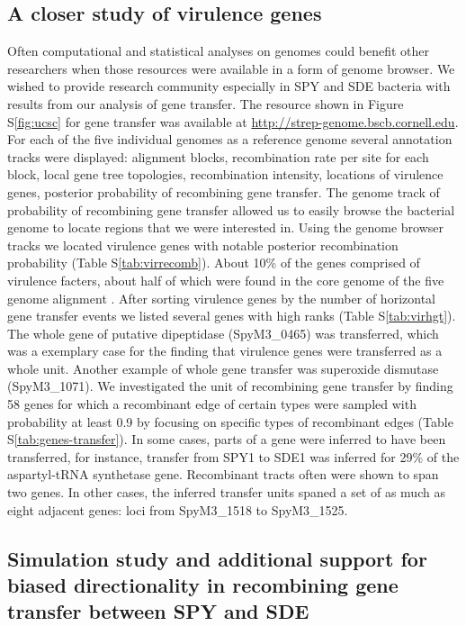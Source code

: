 \documentclass[10pt]{article}
\let\citep\cite
\begin{document}
\subsection*{A closer study of virulence genes}

Often computational and statistical analyses on genomes could benefit other
researchers when those resources were available in a form of genome browser.  We wished to
provide research community especially in SPY and SDE bacteria with results from
our analysis of gene transfer.  The resource shown in Figure S\ref{fig:ucsc} for
gene transfer was available at \url{http://strep-genome.bscb.cornell.edu}.  For
each of the five individual genomes as a reference genome several annotation
tracks were displayed: alignment blocks, recombination rate per site for each
block, local gene tree topologies, recombination intensity, locations of
virulence genes, posterior probability of recombining gene transfer. The genome
track of probability of recombining gene transfer allowed us to easily browse
the bacterial genome to locate regions that we were interested in.  Using
the genome browser tracks we located virulence genes with notable posterior
recombination probability (Table S\ref{tab:virrecomb}).  About 10\% of the genes
comprised of virulence facters, about half of which were found in the core
genome of the five genome alignment \citep{Suzuki2011}.  After sorting virulence
genes by the number of horizontal gene transfer events we listed several genes
with high ranks (Table S\ref{tab:virhgt}).
The whole gene of  putative dipeptidase (SpyM3\_0465) was transferred, which was
a exemplary case for the finding \citep{Chan2009} that virulence genes were transferred as a whole
unit.  Another example of whole gene transfer was superoxide
dismutase (SpyM3\_1071).  We investigated the unit of recombining gene transfer
by finding 58 genes for which a recombinant edge of certain types were sampled
with probability at least 0.9 by focusing on specific types of recombinant edges
(Table S\ref{tab:genes-transfer}).  In some cases, parts of a gene were inferred
to have been transferred, for instance, transfer from SPY1 to SDE1 was inferred
for 29\% of the aspartyl-tRNA synthetase gene. Recombinant tracts often were
shown to span two genes.  In other cases, the inferred transfer units spaned a
set of as much as eight adjacent genes: loci from SpyM3\_1518 to SpyM3\_1525.

\subsection*{Simulation study and additional support for biased directionality in recombining gene transfer between SPY and SDE}
\end{document}
